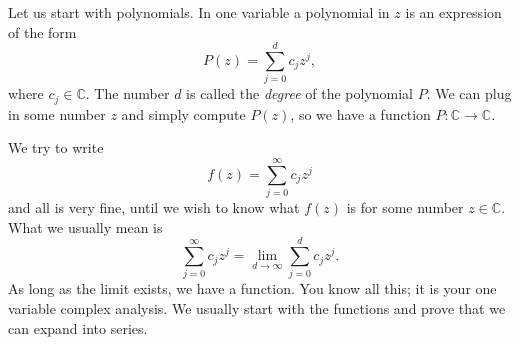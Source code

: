 \documentclass[12pt,openany]{book}
\newcommand{\abs}[1]{\left\lvert {#1} \right\rvert}
\newcommand{\C}{{\mathbb{C}}}
\newcommand{\R}{{\mathbb{R}}}
\newcommand{\myindex}[1]{#1\index{#1}}
\theoremstyle{plain}
\theoremstyle{remark}
\theoremstyle{definition}
\theoremstyle{exercise}
\theoremstyle{example}
\begin{document}
Let us start with polynomials.  In one variable a polynomial in $z$ is
an expression of the form
\begin{equation*}
P(z) = \sum_{j=0}^d c_j z^j ,
\end{equation*}
where $c_j \in \C$.  The number $d$ is called the
\emph{degree}
of the
polynomial $P$.  We can plug in some number $z$ and simply compute
$P(z)$, so we have a function $P \colon \C \to \C$.

We try to write
\begin{equation*}
f(z) = \sum_{j=0}^\infty c_j z^j
\end{equation*}
and all is very fine, until we wish to know what $f(z)$ is for some number
$z \in \C$.
What we usually mean is
\begin{equation*}
\sum_{j=0}^\infty c_j z^j
=
\lim_{d\to\infty}
\sum_{j=0}^d c_j z^j .
\end{equation*}
As long as the limit exists, we have a function.  You know all
this; it is your one variable complex analysis.  We usually
start with the functions and prove that we can expand into series.

\end{document}
